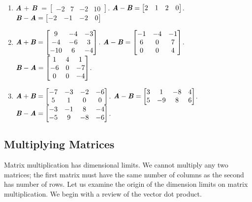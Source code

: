 \begin{Answer}[ref = add_mat]
\begin{enumerate}
\item \textbf{\textit{A}} + \textbf{\textit{B}} $= \begin{bmatrix}
-2 & 7 & -2 & 10
\end{bmatrix}$. $\textbf{\textit{A}} - \textbf{\textit{B}} = \begin{bmatrix}
2 & 1 & 2 & 0
\end{bmatrix}$. $\textbf{\textit{B}} - \textbf{\textit{A}} = \begin{bmatrix}
-2 & -1 & -2 & 0
\end{bmatrix}$
\item $\textbf{\textit{A}} + \textbf{\textit{B}} = \begin{bmatrix}
9 & -4 & -3\\
-4 & -6 & 3\\
-10 & 6 & -4
\end{bmatrix}$. $\textbf{\textit{A}} - \textbf{\textit{B}} = \begin{bmatrix}
-1 & -4 & -1\\
6 & 0 & 7\\
0 & 0 & 4
\end{bmatrix}$. $\textbf{\textit{B}} - \textbf{\textit{A}} = \begin{bmatrix}
1 & 4 & 1\\
-6 & 0 & -7\\
0 & 0 & -4
\end{bmatrix}$.
\item $\textbf{\textit{A}} + \textbf{\textit{B}} = \begin{bmatrix}
-7 & -3 & -2 & -6\\
5 & 1 & 0 & 0
\end{bmatrix}$. $\textbf{\textit{A}} - \textbf{\textit{B}} = \begin{bmatrix}
3 & 1 & -8 & 4\\
5 & -9 & 8 & 6
\end{bmatrix}$. $\textbf{\textit{B}} - \textbf{\textit{A}} = \begin{bmatrix}
-3 & -1 & 8 & -4\\
-5 & 9 & -8 & -6
\end{bmatrix}$.
\end{enumerate}
\end{Answer}

\subsection{Multiplying Matrices}
Matrix multiplication has dimensional limits.
We cannot multiply any two matrices; the first matrix must have the same
number of columns as the second has number of rows. Let us examine the origin
of the dimension limits on matrix multiplication. We begin with a review of
the vector dot product.

